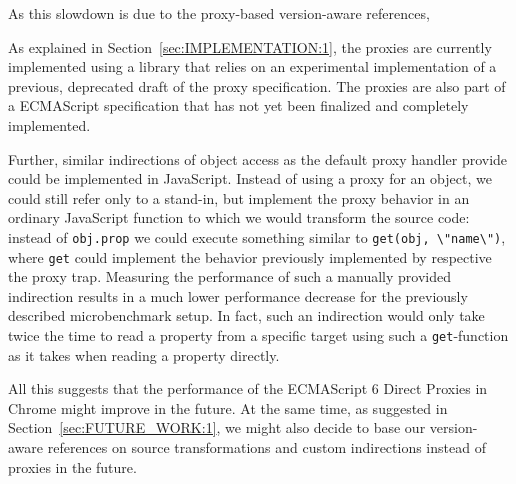 
As this slowdown is due to the proxy-based version-aware references,

As explained in Section~\ref{sec:IMPLEMENTATION:1}, the proxies are currently implemented using a library that relies on an experimental implementation of a previous, deprecated draft of the proxy specification.
The proxies are also part of a ECMAScript specification that has not yet been finalized and completely implemented.


 





Further, similar indirections of object access as the default proxy handler provide could be implemented in JavaScript.
Instead of using a proxy for an object, we could still refer only to a stand-in, but implement the proxy behavior in an ordinary JavaScript function to which we would transform the source code: instead of \lstinline{obj.prop} we could execute something similar to \lstinline{get(obj, \"name\")}, where \lstinline{get} could implement the behavior previously implemented by respective the proxy trap.
Measuring the performance of such a manually provided indirection results in a much lower performance decrease for the previously described microbenchmark setup.
In fact, such an indirection would only take twice the time to read a property from a specific target using such a \lstinline{get}-function as it takes when reading a property directly. 


All this suggests that the performance of the ECMAScript 6 Direct Proxies in Chrome might improve in the future.
At the same time, as suggested in Section~\ref{sec:FUTURE_WORK:1}, we might also decide to base our version-aware references on source transformations and custom indirections instead of proxies in the future.


